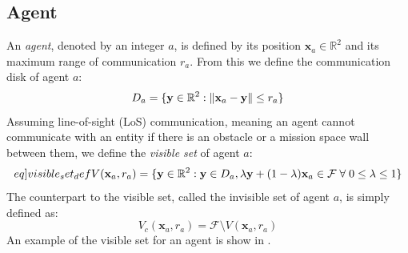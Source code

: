 \subsection{Agent}
An \textit{agent}, denoted by an integer $a$, is defined by its position $\mathbf{x}_{a}\in\mathbb{R}^{2}$ and 
its maximum range of communication $r_{a}$. From this we define the communication disk of agent $a$:
\begin{equation}
  D_{a} = \{\mathbf{y}\in\mathbb{R}^{2}: \left\lVert\mathbf{x}_{a} - \mathbf{y}\right\rVert\leq r_{a}\}
\end{equation}
Assuming line-of-sight (LoS) communication, meaning an agent cannot communicate with an entity if there is an obstacle or a mission space wall between them, we define the \textit{visible set} of agent 
$a$:
\begin{equation}\label[eq]{visible_set_def}
  V(\mathbf{x}_{a}, r_{a}) = \{\mathbf{y}\in\mathbb{R}^{2}:\mathbf{y}\in D_{a}, \lambda\mathbf{y} + (1-\lambda)\mathbf{x}_{a}\in\mathcal{F}\;\forall\;0\leq\lambda\leq 1\}
\end{equation}
The counterpart to the visible set, called the invisible set of agent $a$, is simply defined as:
\begin{equation}
  V_{c}(\mathbf{x}_{a}, r_{a}) = \mathcal{F}\setminus V(\mathbf{x}_{a}, r_{a})
\end{equation}
An example of the visible set for an agent is show in .

